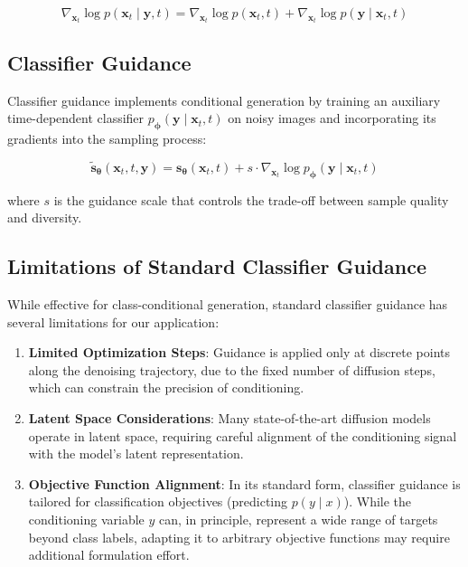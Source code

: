 \documentclass[licencjacka,en]{pracamgr}
\begin{document}
\begin{equation}
\nabla_{\mathbf{x}_t} \log p(\mathbf{x}_t \mid \mathbf{y}, t) = \nabla_{\mathbf{x}_t} \log p(\mathbf{x}_t, t) + \nabla_{\mathbf{x}_t} \log p(\mathbf{y} \mid \mathbf{x}_t, t)
\label{eq:conditional_score}
\end{equation}

\subsection{Classifier Guidance}

Classifier guidance \cite{dhariwal2021diffusionmodelsbeatgans} implements conditional generation by training an auxiliary time-dependent classifier $p_{\boldsymbol{\phi}}(\mathbf{y} \mid \mathbf{x}_t, t)$ on noisy images and incorporating its gradients into the sampling process:

\begin{equation}
\tilde{\mathbf{s}}_{\boldsymbol{\theta}}(\mathbf{x}_t, t, \mathbf{y}) = \mathbf{s}_{\boldsymbol{\theta}}(\mathbf{x}_t, t) + s \cdot \nabla_{\mathbf{x}_t} \log p_{\boldsymbol{\phi}}(\mathbf{y} \mid \mathbf{x}_t, t)
\label{eq:classifier_guidance}
\end{equation}

where $s$ is the guidance scale that controls the trade-off between sample quality and diversity.

\subsection{Limitations of Standard Classifier Guidance}

While effective for class-conditional generation, standard classifier guidance has several limitations for our application:

\begin{enumerate}
\item \textbf{Limited Optimization Steps}: Guidance is applied only at discrete points along the denoising trajectory, due to the fixed number of diffusion steps, which can constrain the precision of conditioning.

\item \textbf{Latent Space Considerations}: Many state-of-the-art diffusion models operate in latent space, requiring careful alignment of the conditioning signal with the model’s latent representation.

\item \textbf{Objective Function Alignment}: In its standard form, classifier guidance is tailored for classification objectives (predicting $p(y \mid x)$). While the conditioning variable $y$ can, in principle, represent a wide range of targets beyond class labels, adapting it to arbitrary objective functions may require additional formulation effort.
\end{enumerate}
\end{document}
